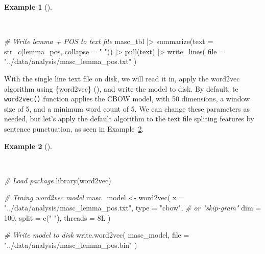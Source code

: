 \documentclass[
  letterpaper,
  krantz1]{latex/krantz-mod}
\newenvironment{Shaded}{\begin{snugshade}}{\end{snugshade}}
\newcommand{\AttributeTok}[1]{\textcolor[rgb]{0.00,0.00,0.00}{#1}}
\newcommand{\CommentTok}[1]{\textcolor[rgb]{0.00,0.00,0.00}{\textit{#1}}}
\newcommand{\DecValTok}[1]{\textcolor[rgb]{0.00,0.00,0.00}{#1}}
\newcommand{\FunctionTok}[1]{\textcolor[rgb]{0.00,0.00,0.00}{#1}}
\newcommand{\NormalTok}[1]{\textcolor[rgb]{0.00,0.00,0.00}{#1}}
\newcommand{\OtherTok}[1]{\textcolor[rgb]{0.00,0.00,0.00}{#1}}
\newcommand{\SpecialCharTok}[1]{\textcolor[rgb]{0.00,0.00,0.00}{#1}}
\newcommand{\StringTok}[1]{\textcolor[rgb]{0.00,0.00,0.00}{#1}}
\theoremstyle{definition}
\newtheorem{example}{Example}[chapter]
\theoremstyle{definition}
\theoremstyle{remark}
\begin{document}
\begin{example}[]\protect\hypertarget{exm-explore-masc-vsm-write-txt}{}\label{exm-explore-masc-vsm-write-txt}

~

\begin{Shaded}
\begin{Highlighting}[numbers=left,,]
\CommentTok{\# Write lemma + POS to text file}
\NormalTok{masc\_tbl }\SpecialCharTok{|\textgreater{}}
  \FunctionTok{summarize}\NormalTok{(}\AttributeTok{text =} \FunctionTok{str\_c}\NormalTok{(lemma\_pos, }\AttributeTok{collapse =} \StringTok{" "}\NormalTok{)) }\SpecialCharTok{|\textgreater{}}
  \FunctionTok{pull}\NormalTok{(text) }\SpecialCharTok{|\textgreater{}}
  \FunctionTok{write\_lines}\NormalTok{(}
    \AttributeTok{file =} \StringTok{"../data/analysis/masc\_lemma\_pos.txt"}
\NormalTok{  )}
\end{Highlighting}
\end{Shaded}

\end{example}

With the single line text file on disk, we will read it in, apply the
word2vec algorithm using \{word2vec\}
(), and write the
model to disk. By default, te \texttt{word2vec()} function applies the
CBOW model, with 50 dimensions, a window size of 5, and a minimum word
count of 5. We can change these parameters as needed, but let's apply
the default algorithm to the text file spliting features by sentence
punctuation, as seen in
Example~\ref{exm-explore-masc-vsm-word2vec-train}.

\begin{example}[]\protect\hypertarget{exm-explore-masc-vsm-word2vec-train}{}\label{exm-explore-masc-vsm-word2vec-train}

~

\begin{Shaded}
\begin{Highlighting}[numbers=left,,]
\CommentTok{\# Load package}
\FunctionTok{library}\NormalTok{(word2vec)}

\CommentTok{\# Traing word2vec model}
\NormalTok{masc\_model }\OtherTok{\textless{}{-}}
  \FunctionTok{word2vec}\NormalTok{(}
    \AttributeTok{x =} \StringTok{"../data/analysis/masc\_lemma\_pos.txt"}\NormalTok{,}
    \AttributeTok{type =} \StringTok{"cbow"}\NormalTok{, }\CommentTok{\# or "skip{-}gram"}
    \AttributeTok{dim =} \DecValTok{100}\NormalTok{,}
    \AttributeTok{split =} \FunctionTok{c}\NormalTok{(}\StringTok{" "}\NormalTok{),}
    \AttributeTok{threads =} \DecValTok{8}\NormalTok{L}
\NormalTok{  )}

\CommentTok{\# Write model to disk}
\FunctionTok{write.word2vec}\NormalTok{(}
\NormalTok{  masc\_model,}
  \AttributeTok{file =} \StringTok{"../data/analysis/masc\_lemma\_pos.bin"}
\NormalTok{)}
\end{Highlighting}
\end{Shaded}

\end{example}
\end{document}
